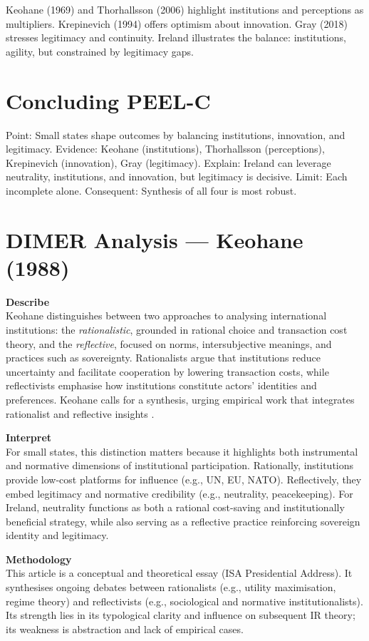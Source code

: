 Keohane (1969) and Thorhallsson (2006) highlight institutions and perceptions as multipliers. Krepinevich (1994) offers optimism about innovation. Gray (2018) stresses legitimacy and continuity. Ireland illustrates the balance: institutions, agility, but constrained by legitimacy gaps.  

\section*{Concluding PEEL-C}

Point: Small states shape outcomes by balancing institutions, innovation, and legitimacy.  
Evidence: Keohane (institutions), Thorhallsson (perceptions), Krepinevich (innovation), Gray (legitimacy).  
Explain: Ireland can leverage neutrality, institutions, and innovation, but legitimacy is decisive.  
Limit: Each incomplete alone.  
Consequent: Synthesis of all four is most robust.  

\section*{DIMER Analysis — Keohane (1988)}

\textbf{Describe} \\
Keohane distinguishes between two approaches to analysing international institutions: the \textit{rationalistic}, grounded in rational choice and transaction cost theory, and the \textit{reflective}, focused on norms, intersubjective meanings, and practices such as sovereignty. Rationalists argue that institutions reduce uncertainty and facilitate cooperation by lowering transaction costs, while reflectivists emphasise how institutions constitute actors’ identities and preferences. Keohane calls for a synthesis, urging empirical work that integrates rationalist and reflective insights \parencite{KEOHANE_1988}.

\textbf{Interpret} \\
For small states, this distinction matters because it highlights both instrumental and normative dimensions of institutional participation. Rationally, institutions provide low-cost platforms for influence (e.g., UN, EU, NATO). Reflectively, they embed legitimacy and normative credibility (e.g., neutrality, peacekeeping). For Ireland, neutrality functions as both a rational cost-saving and institutionally beneficial strategy, while also serving as a reflective practice reinforcing sovereign identity and legitimacy.

\textbf{Methodology} \\
This article is a conceptual and theoretical essay (ISA Presidential Address). It synthesises ongoing debates between rationalists (e.g., utility maximisation, regime theory) and reflectivists (e.g., sociological and normative institutionalists). Its strength lies in its typological clarity and influence on subsequent IR theory; its weakness is abstraction and lack of empirical cases.

